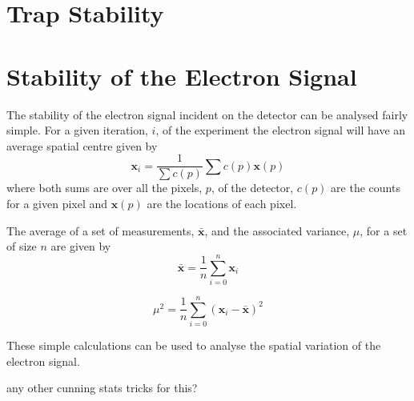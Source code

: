 \section{Trap Stability}

\section{Stability of the Electron Signal}

The stability of the electron signal incident on the detector can be analysed fairly simple. For a given iteration, $i$, of the experiment the electron signal will have an average spatial centre given by
\begin{equation}\label{eq:weight_average_spatial}
\boldsymbol{x}_i = \frac{1}{\sum c(p)} \sum c(p) \boldsymbol x(p)
\end{equation}
where both sums are over all the pixels, $p$, of the detector, $c(p)$ are the counts for a given pixel and $\boldsymbol x(p)$ are the locations of each pixel.

The average of a set of measurements, $\bar{\boldsymbol{x}}$, and the associated variance, $\mu$, for a set of size $n$ are given by
\begin{equation}\label{eq:average_spatial}
\bar{\boldsymbol{x}} = \frac{1}{n} \sum_{i=0}^{n} \boldsymbol{x}_i
\end{equation}

\begin{equation}\label{eq:variance}
\mu^2 = \frac{1}{n} \sum_{i=0}^{n} (\boldsymbol{x}_i - \bar{\boldsymbol{x}})^2
\end{equation}

These simple calculations can be used to analyse the spatial variation of the electron signal.

{\color{red} any other cunning stats tricks for this?}
